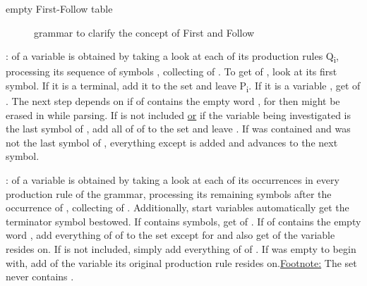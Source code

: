 \begin{table}[H]
	\centering
	\caption{empty First-Follow table}
	\label{tab:example_firstFollow_empty}
	
	
\end{table}

\begin{figure}[H]
	\centering
	
	

	\caption{grammar to clarify the concept of First and Follow}
	\label{fig:grammar_example_firstFollow}
\end{figure}

\underline{}:  of a variable  is obtained by taking a look at each of its production rules Q\textsubscript{i}, processing its sequence of symbols , collecting  of . To get  of , look at its first symbol. If it is a terminal, add it to the set and leave P\textsubscript{i}. If it is a variable , get  of . The next step depends on if  of  contains the empty word \textemptyword{}, for then  might be erased in  while parsing. If \textemptyword{} is not included \underline{or} if the variable being investigated is the last symbol of , add all of  of  to the set and leave . If \textemptyword{} was contained and  was not the last symbol of , everything except \textemptyword{} is added and  advances to the next symbol.

\underline{}:  of a variable  is obtained by taking a look at each of its occurrences in every production rule  of the grammar, processing its remaining symbols after the occurrence of  , collecting  of . Additionally, start variables automatically get the terminator symbol \textterminator{} bestowed. If  contains symbols, get  of . If  of  contains the empty word \textemptyword{}, add everything of  of  to the set except for \textemptyword{} and also get  of the variable  resides on. If \textemptyword{} is not included, simply add everything of  of . If  was empty to begin with, add  of the variable its original production rule  resides on.\linebreak\underline{Footnote:} The  set never contains \textemptyword{}.

